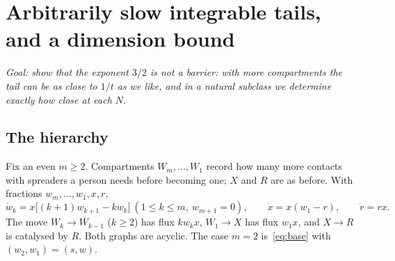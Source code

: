 \documentclass[11pt,a4paper]{article}
\theoremstyle{definition}\newtheorem{definition}[theorem]{Definition}
\theoremstyle{remark}\newtheorem{remark}[theorem]{Remark}
\begin{document}
\section{Arbitrarily slow integrable tails, and a dimension bound}
\label{sec:hierarchy}

\emph{Goal: show that the exponent $3/2$ is not a barrier: with more
compartments the tail can be as close to $1/t$ as we like, and in a
natural subclass we determine exactly how close at each $N$.}

\subsection{The hierarchy}
Fix an even $m\ge2$. Compartments $W_m,\dots,W_1$ record how many more
contacts with spreaders a person needs before becoming one; $X$ and
$R$ are as before. With fractions $w_m,\dots,w_1,x,r$,
\begin{equation}
\dot w_k=x\bigl[(k+1)w_{k+1}-kw_k\bigr]\ (1\le k\le m,\ w_{m+1}=0),\qquad
\dot x=x(w_1-r),\qquad \dot r=rx .
\label{eq:family}
\end{equation}
The move $W_k\to W_{k-1}$ ($k\ge2$) has flux $kw_kx$, $W_1\to X$ has
flux $w_1x$, and $X\to R$ is catalysed by $R$. Both graphs are acyclic.
The case $m=2$ is~\eqref{eq:base} with $(w_2,w_1)=(s,w)$.
\end{document}
